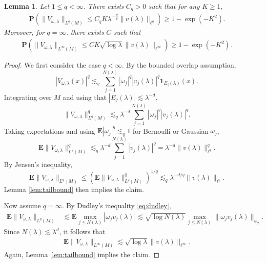\documentclass[12pt,reqno]{amsart}
\newtheorem{lemma}[theorem]{Lemma}
\theoremstyle{definition}
\theoremstyle{remark}
\numberwithin{equation}{section}
\newcommand{\1}{\mathbbm{1}}
\begin{document}
\begin{lemma}\label{lem:Linfty_norm}
Let $1\leq q <\infty$.
There exists $C_q>0$ such that for any $K\geq 1$, 
\begin{align}%
\mathbf{P}(\|V_{\omega,\lambda}\|_{L^{q}(M)}\leq C_qK\lambda^{-\frac{d}{q}}\|v(\lambda)\|_{\ell^{q}})
\geq 1-\exp(-K^2).
\end{align}
Moreover, for $q=\infty$, there exists $C$ such that
\begin{align}%
\mathbf{P}(\|V_{\omega,\lambda}\|_{L^{\infty}(M)}\leq CK\sqrt{\log\lambda}\|v(\lambda)\|_{\ell^{\infty}})
\geq 1-\exp(-K^2).
\end{align}
\end{lemma}

\begin{proof}
We first consider the case $q<\infty$.
By the bounded overlap assumption,
\[|V_{\omega,\lambda}(x)|^q
\lesssim_q
\sum_{j=1}^{N(\lambda)}
|\omega_j|^q |v_j(\lambda)|^q \mathbf{1}_{E_j(\lambda)}(x).\]
Integrating over \(M\) and using that \(|E_j(\lambda)|\lesssim \lambda^{-d}\),
\[\|V_{\omega,\lambda}\|_{L^q(M)}^q
\lesssim_q
\lambda^{-d}
\sum_{j=1}^{N(\lambda)}
|\omega_j|^q |v_j(\lambda)|^q.\]
Taking expectations and using \(\mathbf{E}|\omega_j|^q \lesssim_q 1\) for Bernoulli or Gaussian \(\omega_j\),
\[
\mathbf{E}\|V_{\omega,\lambda}\|_{L^q(M)}^q
\lesssim_q
\lambda^{-d}\sum_{j=1}^{N(\lambda)}|v_j(\lambda)|^q
=
\lambda^{-d}\|v(\lambda)\|_{\ell^q}^q.
\]
By Jensen's inequality,
\[
\mathbf{E}\|V_{\omega,\lambda}\|_{L^q(M)}\leq (\mathbf{E}\|V_{\omega,\lambda}\|_{L^q(M)}^q)^{1/q}\lesssim_q \lambda^{-d/q}\|v(\lambda)\|_{\ell^q}.
\]
Lemma \ref{lem:tailbound} then implies the claim.



Now assume $q=\infty$.
By Dudley's inequality \eqref{eq:dudley},
\begin{align*}
\mathbf{E}\|V_{\omega,\lambda}\|_{L^{q}(M)}
&\lesssim \mathbf{E}\max_{j\leq N(\lambda)}|\omega_jv_j(\lambda)|\lesssim \sqrt{\log N(\lambda)} \max_{j\leq N(\lambda)}\|\omega_jv_j(\lambda)\|_{\psi_2}.
\end{align*}
Since $N(\lambda)\lesssim\lambda^d$, it follows that
\begin{align}
\mathbf{E}\|V_{\omega,\lambda}\|_{L^{\infty}(M)}
\lesssim\sqrt{\log\lambda} \|v(\lambda)\|_{\ell^{\infty}}.
\end{align}
Again, Lemma \ref{lem:tailbound} implies the claim.
\end{proof}
\end{document}
